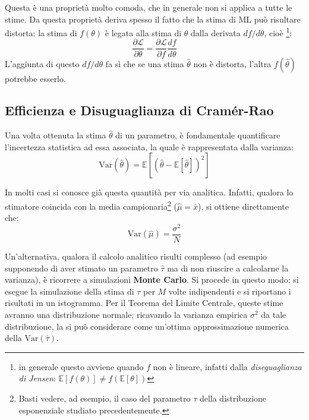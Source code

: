 \documentclass[openany,a4paper,12pt]{book}
\providecommand{\mathscr}[1]{\mathcal{#1}}
\theoremstyle{remark}
\begin{document}
Questa è una proprietà molto comoda, che in generale non si applica a tutte le stime. Da questa proprietà deriva spesso il fatto che la stima di ML può risultare distorta: la stima di $f(\theta)$ è legata alla stima di $\theta$ dalla derivata $df/d\theta$, cioè \footnote{in generale questo avviene quando $f$ non è lineare, infatti dalla \textit{diseguaglianza di Jensen}: $\mathbb{E}[f(\theta)] \neq f(\mathbb{E}[\theta])$}:
\begin{equation}
    \frac{\partial \mathscr{L}}{\partial \theta} = \frac{\partial \mathscr{L}}{\partial f} \frac{df}{d\theta}
\end{equation}
L'aggiunta di questo $df/d\theta$ fa sì che se una stima $\hat{\theta}$ non è distorta, l'altra ${f(\hat \theta)}$ potrebbe esserlo.

\subsection{Efficienza e Disuguaglianza di Cramér-Rao}

Una volta ottenuta la stima $\hat{\theta}$ di un parametro, è fondamentale quantificare l'incertezza statistica ad essa associata, la quale è rappresentata dalla varianza:
\begin{equation}
    \mathrm{Var}(\hat{\theta}) = \mathbb{E}\left[ (\hat{\theta} - \mathbb{E}[\hat{\theta}])^2 \right]
\end{equation}

In molti casi si conosce già questa quantità per via analitica. Infatti, qualora lo stimatore coincida con la media campionaria\footnote{Basti vedere, ad esempio, il caso del parametro $\tau$ della distribuzione esponenziale studiato precedentemente.} ($\hat{\mu} = \bar{x}$), si ottiene direttamente che:
\begin{equation}
    \mathrm{Var}(\hat{\mu}) = \frac{\sigma^2}{N}
\end{equation}

Un'alternativa, qualora il calcolo analitico risulti complesso (ad esempio supponendo di aver stimato un parametro $\hat{\tau}$ ma di non riuscire a calcolarne la varianza), è ricorrere a simulazioni \textbf{Monte Carlo}. Si procede in questo modo: si esegue la simulazione della stima di $\tau$ per $M$ volte indipendenti e si riportano i risultati in un istogramma. Per il Teorema del Limite Centrale, queste stime avranno una distribuzione normale; ricavando la varianza empirica $\sigma^2$ da tale distribuzione, la si può considerare come un'ottima approssimazione numerica della $\mathrm{Var}(\hat{\tau})$.
\end{document}
